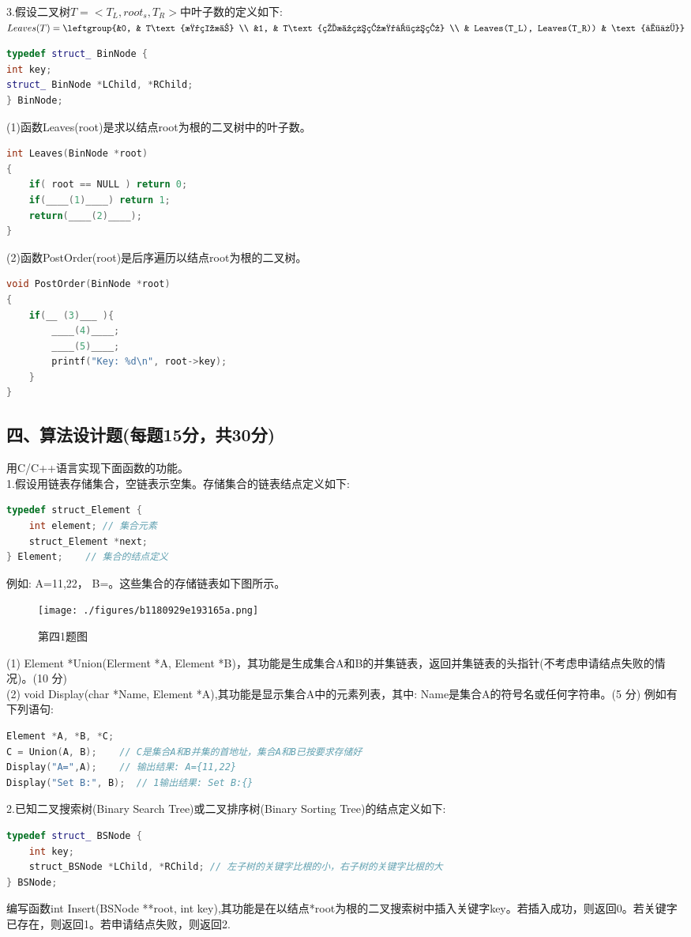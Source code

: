 3.假设二叉树$T=<T_L, root_s, T_R>$中叶子数的定义如下: \\
$Leaves(T)=\leftgroup{&0, & T\text{是空树} \\ &1, & T\text{的根结点是叶结点} \\ & Leaves(T_L), Leaves(T_R)) & \text{其他}}$
\\
\begin{lstlisting}[language=cpp]
typedef struct_ BinNode {
int key;
struct_ BinNode *LChild, *RChild;
} BinNode;
\end{lstlisting}
(1)函数Leaves(root)是求以结点root为根的二叉树中的叶子数。
\begin{lstlisting}[language=cpp]
int Leaves(BinNode *root)
{
    if( root == NULL ) return 0;
    if(____(1)____) return 1;
    return(____(2)____);
}
\end{lstlisting}
(2)函数PostOrder(root)是后序遍历以结点root为根的二叉树。
\begin{lstlisting}[language=cpp]
void PostOrder(BinNode *root)
{
    if(__ (3)___ ){
        ____(4)____;
        ____(5)____;
        printf("Key: %d\n", root->key);
    }
}
\end{lstlisting}

\subsection{四、算法设计题(每题15分，共30分)}
用C/C++语言实现下面函数的功能。 \\
1.假设用链表存储集合，空链表示空集。存储集合的链表结点定义如下:
\begin{lstlisting}[language=cpp]
typedef struct_Element {
    int element; // 集合元素
    struct_Element *next;
} Element;    // 集合的结点定义
\end{lstlisting}
例如: A={11,22}， B={}。这些集合的存储链表如下图所示。
\begin{figure}[ht]
\centering
\texttt{[image: ./figures/b1180929e193165a.png]}
\caption{第四1题图} \label{fig_SYDS14_4}
\end{figure}
(1) Element *Union(Elerment *A, Element *B)，其功能是生成集合A和B的并集链表，返回并集链表的头指针(不考虑申请结点失败的情况)。(10 分) \\
(2) void Display(char *Name, Element *A),其功能是显示集合A中的元素列表，其中: Name是集合A的符号名或任何字符串。(5 分)
例如有下列语句:
\begin{lstlisting}[language=cpp]
Element *A, *B, *C;
C = Union(A, B);    // C是集合A和B并集的首地址，集合A和B已按要求存储好
Display("A=",A);    // 输出结果: A={11,22}
Display("Set B:", B);  // 1输出结果: Set B:{}
\end{lstlisting}

2.已知二叉搜索树(Binary Search Tree)或二叉排序树(Binary Sorting Tree)的结点定义如下:
\begin{lstlisting}[language=cpp]
typedef struct_ BSNode {
    int key;
    struct_BSNode *LChild, *RChild; // 左子树的关键字比根的小，右子树的关键字比根的大
} BSNode; 
\end{lstlisting}
编写函数int Insert(BSNode **root, int key),其功能是在以结点*root为根的二叉搜索树中插入关键字key。若插入成功，则返回0。若关键字已存在，则返回1。若申请结点失败，则返回2.
